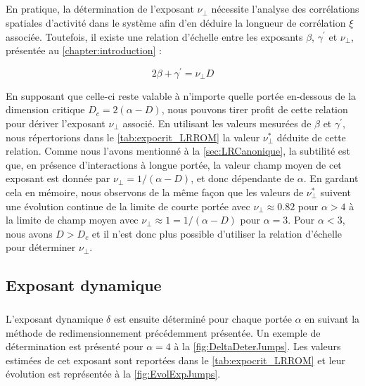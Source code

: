 \subparagraph{}En pratique, la détermination de l'exposant $\nu_\perp$ nécessite l'analyse des corrélations spatiales d'activité dans le système afin d'en déduire la longueur de corrélation $\xi$ associée. Toutefois, il existe une relation d'échelle entre les exposants $\beta$, $\gamma^\prime$ et $\nu_\perp$, présentée au \autoref{chapter:introduction} :

\begin{equation}
	2\beta + \gamma^\prime = \nu_\perp D
	\label{eq:HyperScaling}
\end{equation}

\noindent En supposant que celle-ci reste valable à n'importe quelle portée en-dessous de la dimension critique $D_c = 2(\alpha-D)$, nous pouvons tirer profit de cette relation pour dériver l'exposant $\nu_\perp$ associé. En utilisant les valeurs mesurées de $\beta$ et $\gamma^\prime$, nous répertorions dans le \autoref{tab:expocrit_LRROM} la valeur $\nu_\perp^*$ déduite de cette relation. Comme nous l'avons mentionné à la \autoref{sec:LRCanonique}, la subtilité est que, en présence d'interactions à longue portée, la valeur champ moyen de cet exposant est donnée par $\nu_\perp = 1/(\alpha-D)$, et donc dépendante de $\alpha$. En gardant cela en mémoire, nous observons de la même façon que les valeurs de $\nu_\perp^*$ suivent une évolution continue de la limite de courte portée avec $\nu_\perp \approx 0.82$ pour $\alpha>4$ à la limite de champ moyen avec $\nu_\perp\approx 1 = 1/(\alpha-D)$ pour $\alpha=3$. Pour $\alpha < 3$, nous avons $D>D_c$ et il n'est donc plus possible d'utiliser la relation d'échelle pour déterminer $\nu_\perp$. 


\subsection{Exposant dynamique}

\label{sec:expdynjump}

\subparagraph{}L'exposant dynamique $\delta$ est ensuite déterminé pour chaque portée $\alpha$ en suivant la méthode de redimensionnement précédemment présentée. Un exemple de détermination est présenté pour $\alpha = 4$ à la \autoref{fig:DeltaDeterJumps}. Les valeurs estimées de cet exposant sont reportées dans le \autoref{tab:expocrit_LRROM} et leur évolution est représentée à la \autoref{fig:EvolExpJumps}.

